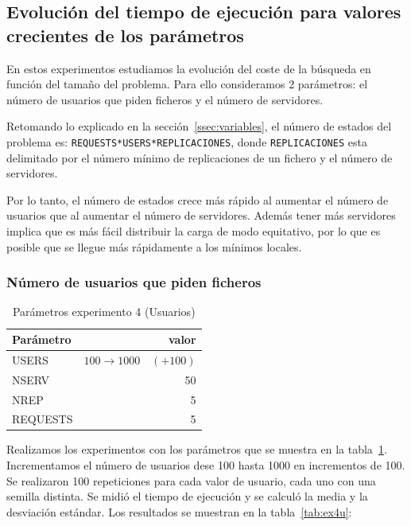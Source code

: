 \pagebreak


\subsection{Evolución del tiempo de ejecución para valores crecientes de los parámetros}

En estos experimentos estudiamos la evolución del coste de la búsqueda en función del tamaño del
problema. Para ello consideramos 2 parámetros: el número de usuarios que piden ficheros y el número
de servidores.

Retomando lo explicado en la sección~\ref{ssec:variables}, el número de estados del problema es:
\texttt{REQUESTS*USERS*REPLICACIONES}, donde \texttt{REPLICACIONES} esta delimitado por
el número mínimo de replicaciones de un fichero y el número de servidores.

Por lo tanto, el número de estados crece más rápido al aumentar el número de usuarios que al aumentar
el número de servidores. Además tener más servidores implica que es más fácil distribuir la carga de modo
equitativo, por lo que es posible que se llegue más rápidamente a los mínimos locales.

\subsubsection{Número de usuarios que piden ficheros}

\begin{table}[H]
    \caption{Parámetros experimento 4 (Usuarios)}%
    \label{tab:ex4u_par}
    \begin{center}
    \begin{tabular}{lr}
    \toprule
    Parámetro & valor \\
    \midrule
    USERS & $100 \to 1000 \quad (+100)$ \\
    NSERV & 50 \\
    NREP & 5 \\
    REQUESTS & 5\\
    \bottomrule
    \end{tabular}
    \end{center}
\end{table}

Realizamos los experimentos con los parámetros que se muestra en la tabla~\ref{tab:ex4u_par}. Incrementamos
el número de usuarios dese 100 hasta 1000 en incrementos de 100. Se realizaron 100 repeticiones para
cada valor de usuario, cada uno con una semilla distinta. Se midió el tiempo de ejecución y se calculó la media
y la desviación estándar. Los resultados se muestran en la tabla~\ref{tab:ex4u}:

